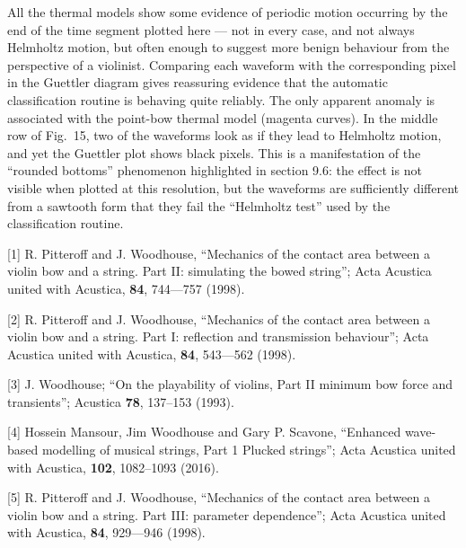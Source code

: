   All the thermal models show some evidence of periodic motion occurring by the 
  end of the time segment plotted here — not in every case, and not always 
  Helmholtz motion, but often enough to suggest more benign behaviour from the 
  perspective of a violinist. Comparing each waveform with the corresponding 
  pixel in the Guettler diagram gives reassuring evidence that the automatic 
  classification routine is behaving quite reliably. The only apparent anomaly 
  is associated with the point-bow thermal model (magenta curves). In the 
  middle row of Fig.\ 15, two of the waveforms look as if they lead to 
  Helmholtz motion, and yet the Guettler plot shows black pixels. This is a 
  manifestation of the “rounded bottoms” phenomenon highlighted in section 9.6: 
  the effect is not visible when plotted at this resolution, but the waveforms 
  are sufficiently different from a sawtooth form that they fail the “Helmholtz 
  test” used by the classification routine. 

  \sectionreferences{}[1] R. Pitteroff and J. Woodhouse, “Mechanics of the 
  contact area between a violin bow and a string. Part II: simulating the bowed 
  string”; Acta Acustica united with Acustica, \textbf{84}, 744—757 (1998). 

  [2] R. Pitteroff and J. Woodhouse, “Mechanics of the contact area between a 
  violin bow and a string. Part I: reflection and transmission behaviour”; Acta 
  Acustica united with Acustica, \textbf{84}, 543—562 (1998). 

  [3] J. Woodhouse; “On the playability of violins, Part II minimum bow force 
  and transients”; Acustica \textbf{78}, 137–153 (1993). 

  [4] Hossein Mansour, Jim Woodhouse and Gary P. Scavone, “Enhanced wave-based 
  modelling of musical strings, Part 1 Plucked strings”; Acta Acustica united 
  with Acustica, \textbf{102}, 1082–1093 (2016). 

  [5] R. Pitteroff and J. Woodhouse, “Mechanics of the contact area between a 
  violin bow and a string. Part III: parameter dependence”; Acta Acustica 
  united with Acustica, \textbf{84}, 929—946 (1998). 